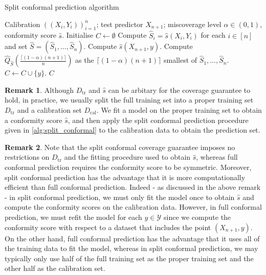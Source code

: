 \documentclass[11pt, titlepage]{article} %
\numberwithin{equation}{section}
\theoremstyle{definition}
\newtheorem{remark}{Remark}
\numberwithin{theorem}{section}
\numberwithin{lemma}{section}
\numberwithin{corollary}{section}
\numberwithin{proposition}{section}
\numberwithin{definition}{section}
\numberwithin{remark}{section}
\begin{document}
\begin{algorithm}[H]
\caption{Split conformal prediction algorithm}
\label{alg:splitconformal}
\begin{algorithmic}
    \Require Calibration \(((X_i, Y_i))_{i=1}^n\); test predictor \(X_{n+1}\); miscoverage level \(\alpha \in (0,1)\), conformity score \(\hat{s}\).
    \State Initialise \(C \gets \emptyset\)
    \State Compute \(\hat{S}_i = \hat{s}(X_i,Y_i)\) for each \(i \in [n]\) and set \(\hat{S} = (\hat{S}_1, \ldots, \hat{S}_n).\)
        \State Compute \(\hat{s}(X_{n+1}, y)\).
        \State Compute \(\hat{Q}_{\hat{S}} \left( \frac{\lceil (1-\alpha)(n+1) \rceil}{n} \right)\) as the \(\lceil (1-\alpha)(n+1) \rceil \) smallest of \(\hat{S}_1, \ldots, \hat{S}_n\).
            \State \(C \gets C \cup \{y\} \).
        \EndIf
    \EndFor
    \Ensure \(C\)
\end{algorithmic}
\label{alg:split_conformal}
\end{algorithm}

\begin{remark}
    Although \(D_\mathrm{tr}\) and \(\hat{s}\) can be arbitary for the coverage guarantee to hold, in practice, we usually split the full training set into a proper training set \(D_\mathrm{tr}\) and a calibration set \(D_\mathrm{cal}\). We fit a model on the proper training set to obtain a conformity score \(\hat{s}\), and then apply the split conformal prediction procedure given in \cref{alg:split_conformal} to the calibration data to obtain the prediction set.
\end{remark}

\begin{remark}
    Note that the split conformal coverage guarantee imposes no restrictions on \(D_\mathrm{tr}\) and the fitting procedure used to obtain \(\hat{s}\), whereas full conformal prediction requires the conformity score to be symmetric. Moreover, split conformal prediction has the advantage that it is more computationally efficient than full conformal prediction. Indeed - as discussed in the above remark - in split conformal prediction, we must only fit the model once to obtain \(\hat{s}\) and compute the conformity scores on the calibration data. However, in full conformal prediction, we must refit the model for each \(y \in \mathcal{Y}\) since we compute the conformity score with respect to a dataset that includes the point \((X_{n+1}, y)\). On the other hand, full conformal prediction has the advantage that it uses all of the training data to fit the model, whereas in split conformal prediction, we may typically only use half of the full training set as the proper training set and the other half as the calibration set.
\end{remark}
\end{document}
